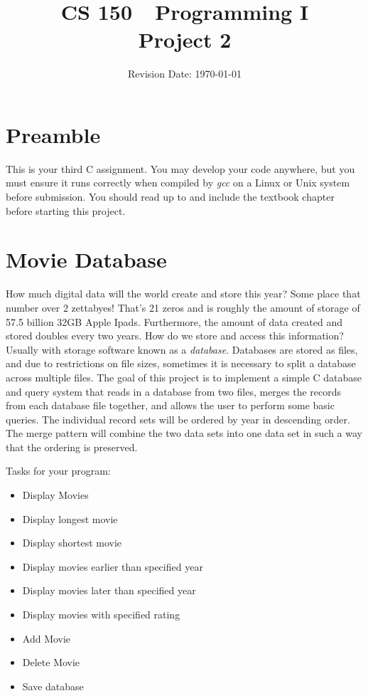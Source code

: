 \documentclass{article}
\title{CS 150~~Programming I\\
Project 2}
\date{Revision Date: \today}
\begin{document}
\maketitle

\thispagestyle{empty}

\W\subsubsection{}
\W\htmlrule



\section*{Preamble}
This is your third C assignment.
You may develop your code anywhere,
but you must ensure it
runs correctly when compiled by {\it gcc}
on a Linux or Unix system
before submission.
You should read up to and include the textbook chapter
before starting this project.


\section*{Movie Database} 
How much digital data will the world create and store this year?
Some place that number over 2 zettabyes! That's 21 zeros and is
roughly the amount of storage  of 57.5
billion 32GB Apple Ipads.  Furthermore, the
amount of data created and stored doubles every two years.  How do
we store and access this information? Usually with storage software
known as a {\it database}.  Databases are stored as files, and due
to restrictions on file sizes, sometimes it is necessary to split
a database across multiple files.
The goal of this project is to implement a simple
C database and query system that reads in a database from two files,
merges the records from each database file together, and allows 
the user to perform some basic queries.  The individual
record sets will be ordered by year in descending order.  The merge
pattern will combine the two data sets into one data set
in such a way that the ordering is preserved.

Tasks for your program:

\begin{itemize}
\item
    Display Movies
\item
    Display longest movie
\item
    Display shortest movie
\item
    Display movies earlier than specified year
\item
    Display movies later than specified year
\item
    Display movies with specified rating
\item
    Add Movie
\item
    Delete Movie
\item
    Save database
\end{itemize}
\end{document}
